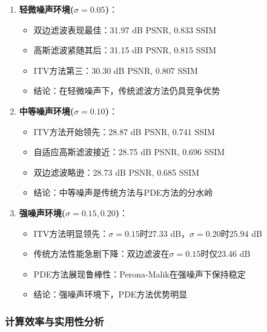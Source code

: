 \documentclass[a4paper,12pt]{ctexart}
\begin{document}
\begin{enumerate}
    \item \textbf{轻微噪声环境($\sigma=0.05$)}：
    \begin{itemize}
        \item 双边滤波表现最佳：31.97 dB PSNR, 0.833 SSIM
        \item 高斯滤波紧随其后：31.15 dB PSNR, 0.815 SSIM  
        \item ITV方法第三：30.30 dB PSNR, 0.807 SSIM
        \item 结论：在轻微噪声下，传统滤波方法仍具竞争优势
    \end{itemize}

    \item \textbf{中等噪声环境($\sigma=0.10$)}：
    \begin{itemize}
        \item ITV方法开始领先：28.87 dB PSNR, 0.741 SSIM
        \item 自适应高斯滤波接近：28.75 dB PSNR, 0.696 SSIM
        \item 双边滤波略逊：28.73 dB PSNR, 0.685 SSIM
        \item 结论：中等噪声是传统方法与PDE方法的分水岭
    \end{itemize}

    \item \textbf{强噪声环境($\sigma=0.15, 0.20$)}：
    \begin{itemize}
        \item ITV方法明显领先：$\sigma=0.15$时27.33 dB，$\sigma=0.20$时25.94 dB
        \item 传统方法性能急剧下降：双边滤波在$\sigma=0.15$时仅23.46 dB
        \item PDE方法展现鲁棒性：Perona-Malik在强噪声下保持稳定
        \item 结论：强噪声环境下，PDE方法优势明显
    \end{itemize}
\end{enumerate}

\subsubsection{计算效率与实用性分析}
\end{document}
